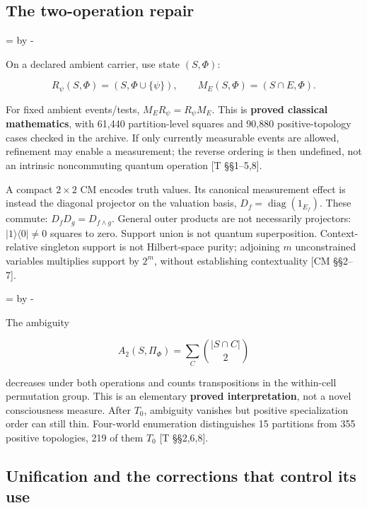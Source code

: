\documentclass[10pt,letterpaper]{article}
\newcommand{\NeedDisplaySpace}{\par\begingroup\dimen0=\pagegoal\advance\dimen0 by -\pagetotal\ifdim\dimen0<8\baselineskip\newpage\fi\endgroup}
\begin{document}
\subsection*{The two-operation repair}

\NeedDisplaySpace
\begin{samepage}
On a declared ambient carrier, use state \((S,\Phi)\):\par
\[
R_\psi(S,\Phi)=(S,\Phi\cup\{\psi\}),\qquad
M_E(S,\Phi)=(S\cap E,\Phi).
\]
\end{samepage}
For fixed ambient events/tests, \(M_ER_\psi=R_\psi M_E\). This is \textbf{proved classical mathematics}, with 61,440 partition-level squares and 90,880 positive-topology cases checked in the archive. If only currently measurable events are allowed, refinement may enable a measurement; the reverse ordering is then undefined, not an intrinsic noncommuting quantum operation [T \S{}\S{}1--5,8].\par

A compact \(2\times2\) CM encodes truth values. Its canonical measurement effect is instead the diagonal projector on the valuation basis, \(D_f=\operatorname{diag}(1_{E_f})\). These commute: \(D_fD_g=D_{f\wedge g}\). General outer products are not necessarily projectors: \(|1\rangle\langle0|\ne0\) squares to zero. Support union is not quantum superposition. Context-relative singleton support is not Hilbert-space purity; adjoining \(m\) unconstrained variables multiplies support by \(2^m\), without establishing contextuality [CM \S{}\S{}2--7].\par

\NeedDisplaySpace
\begin{samepage}
The ambiguity\par
\[
A_2(S,\Pi_\Phi)=\sum_C\binom{|S\cap C|}{2}
\]
\end{samepage}
decreases under both operations and counts transpositions in the within-cell permutation group. This is an elementary \textbf{proved interpretation}, not a novel consciousness measure. After \(T_0\), ambiguity vanishes but positive specialization order can still thin. Four-world enumeration distinguishes 15 partitions from 355 positive topologies, 219 of them \(T_0\) [T \S{}\S{}2,6,8].\par

\subsection*{Unification and the corrections that control its use}
\end{document}
